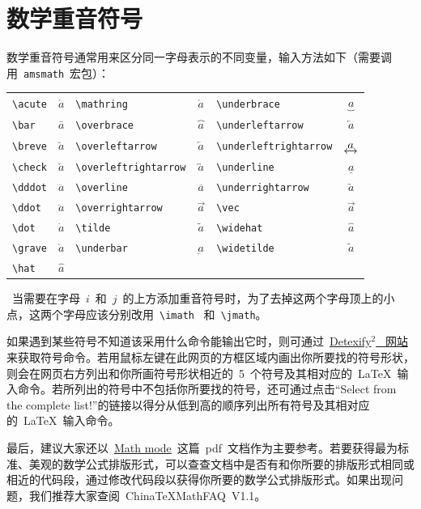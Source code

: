 \section{数学重音符号}
数学重音符号通常用来区分同一字母表示的不同变量，输入方法如下（需要调用~\verb|amsmath|~宏包）：

\vspace{0.5em}\noindent\wuhao\begin{tabularx}{\textwidth}{Xc|Xc|Xc}
 \verb|\acute| & $\acute{a}$ & \verb|\mathring| & $\mathring{a}$ & \verb|\underbrace| & $\underbrace{a}$ \\
 \verb|\bar| & $\bar{a}$ & \verb|\overbrace| & $\overbrace{a}$ & \verb|\underleftarrow| & $\underleftarrow{a}$ \\
 \verb|\breve| & $\breve{a}$ & \verb|\overleftarrow| & $\overleftarrow{a}$ & \verb|\underleftrightarrow| & $\underleftrightarrow{a}$ \\
 \verb|\check| & $\check{a}$ & \verb|\overleftrightarrow| & $\overleftrightarrow{a}$ & \verb|\underline| & $\underline{a}$ \\
 \verb|\dddot| & $\dddot{a}$ & \verb|\overline| & $\overline{a}$ & \verb|\underrightarrow| & $\underrightarrow{a}$ \\
 \verb|\ddot| & $\ddot{a}$ & \verb|\overrightarrow| & $\overrightarrow{a}$ & \verb|\vec| & $\vec{a}$ \\
 \verb|\dot| & $\dot{a}$ & \verb|\tilde| & $\tilde{a}$ & \verb|\widehat| & $\widehat{a}$ \\
 \verb|\grave| & $\grave{a}$ & \verb|\underbar| & $\underbar{a}$ & \verb|\widetilde| & $\widetilde{a}$ \\
 \verb|\hat| & $\hat{a}$
\end{tabularx}\vspace{0.5em}

\xiaosi~当需要在字母~$i$~和~$j$~的上方添加重音符号时，为了去掉这两个字母顶上的小点，这两个字母应该分别改用~\verb|\imath|~ 和~\verb|\jmath|。

如果遇到某些符号不知道该采用什么命令能输出它时，则可通过~\href{http://detexify.kirelabs.org/classify.html}{Detexify$^2$~ 网站}来获取符号命令。若用鼠标左键在此网页的方框区域内画出你所要找的符号形状，则会在网页右方列出和你所画符号形状相近的~5~个符号及其相对应的~\LaTeX~输入命令。若所列出的符号中不包括你所要找的符号，还可通过点击“Select from the complete list!”的链接以得分从低到高的顺序列出所有符号及其相对应的~\LaTeX~输入命令。

最后，建议大家还以~\href{http://tug.ctan.org/cgi-bin/ctanPackageInformation.py?id=voss-mathmode}{Math mode}~这篇~pdf~文档作为主要参考。若要获得最为标准、美观的数学公式排版形式，可以查查文档中是否有和你所要的排版形式相同或相近的代码段，通过修改代码段以获得你所要的数学公式排版形式。如果出现问题，我们推荐大家查阅~ChinaTeXMathFAQ~V1.1。


